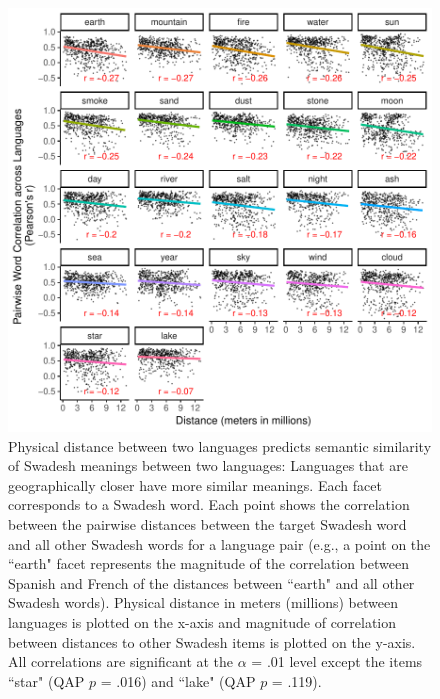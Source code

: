 \documentclass[9pt,twoside,lineno]{pnas-new}
\begin{document}
\begin{figure}[h]
\centering
     \includegraphics[width=6in]{suppfigs/swadesh_plot_ED.pdf}
 \caption{Physical distance between two languages predicts semantic similarity of Swadesh meanings between two languages: Languages that are geographically closer have more similar meanings. Each facet corresponds to a Swadesh word. Each point shows the correlation between the pairwise distances between the target Swadesh word and all other Swadesh words for a language pair (e.g., a point on the ``earth" facet represents the magnitude of the correlation between Spanish and French of  the distances between ``earth" and all other Swadesh words). Physical distance  in meters (millions) between languages is plotted on the x-axis and magnitude of correlation between distances to other Swadesh items is plotted on the y-axis. All correlations are significant at the $\alpha$ = .01 level except the items ``star" (QAP $p$ = .016) and ``lake" (QAP $p$ = .119).}
 \end{figure}


\pagebreak
\clearpage




\end{document}
